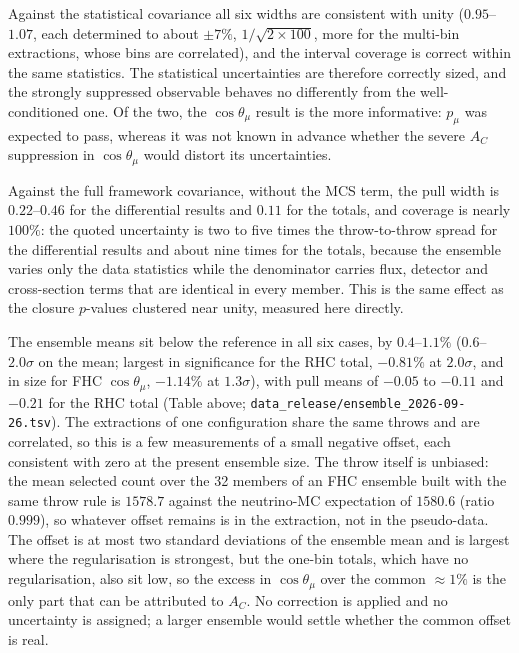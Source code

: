 \documentclass[11pt,a4paper]{article}
\begin{document}
Against the statistical covariance all six widths are consistent with unity ($0.95$--$1.07$,
each determined to about $\pm7\%$, $1/\sqrt{2\times100}$, more for the multi-bin extractions,
whose bins are correlated), and the interval coverage is correct within the same statistics. The
statistical uncertainties are therefore correctly sized, and the strongly suppressed observable
behaves no differently from the well-conditioned one. Of the two, the $\cos\theta_\mu$ result
is the more informative: $p_\mu$ was expected to pass, whereas it was not known in advance
whether the severe $A_C$ suppression in $\cos\theta_\mu$ would distort its uncertainties.

Against the full framework covariance, without the MCS term, the pull width
is $0.22$--$0.46$ for the differential results and $0.11$ for the totals, and coverage is
nearly $100\%$: the quoted
uncertainty is two to five times the throw-to-throw spread for the differential results and about
nine times for the totals, because the ensemble varies
only the data statistics while the denominator carries flux, detector and cross-section
terms that are identical in every member.  This is the same effect as the closure
$p$-values clustered near unity, measured here directly.

The ensemble means sit below the reference in all six cases, by $0.4$--$1.1\%$
($0.6$--$2.0\sigma$ on the mean; largest in significance for the RHC total, $-0.81\%$ at $2.0\sigma$,
and in size for FHC $\cos\theta_\mu$, $-1.14\%$ at $1.3\sigma$), with pull means of $-0.05$
to $-0.11$ and $-0.21$ for the RHC total (Table above; \texttt{data\_release/ensemble\_2026-09-26.tsv}). The
extractions of one configuration share the same throws and are correlated, so this is a few
measurements of a small negative offset, each consistent with zero at the present ensemble
size. The throw itself is unbiased: the mean selected count over the 32
members of an FHC ensemble built with the same throw rule is $1578.7$ against the neutrino-MC expectation of $1580.6$ (ratio $0.999$), so
whatever offset remains is in the extraction, not in the pseudo-data. The offset is at most two standard
deviations of the ensemble mean and is largest where the regularisation is strongest,
but the one-bin totals, which have no regularisation, also sit low, so the excess in
$\cos\theta_\mu$ over the common $\approx1\%$ is the only part that can be attributed
to $A_C$. No correction is applied and no uncertainty is assigned; a larger ensemble
would settle whether the common offset is real.
\end{document}
